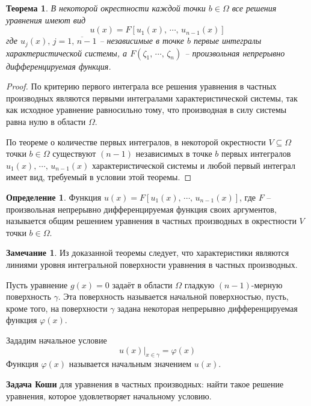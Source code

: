 \documentclass[a4paper,12pt]{article}
\renewcommand{\phi}{\ensuremath{\varphi}}
\theoremstyle{plain}
\newtheorem{theorem}{Теорема}[section]
\theoremstyle{definition}
\newtheorem{definition}{Определение}[section]
\newtheorem*{note}{Замечание}
\theoremstyle{remark}
\begin{document}
\begin{theorem}
	В некоторой окрестности каждой точки $b \in \Omega$ все решения уравнения имеют вид
	\[u(x) = F[u_1(x),\,\cdots,\,u_{n-1}(x)]\]
	где $u_j(x),\, j = \overline{1,\,n-1}$ -- независимые в точке $b$ первые интегралы характеристической системы, а $F(\zeta_1,\,\cdots,\,\zeta_n)$ -- произвольная непрерывно дифференцируемая функция.
\end{theorem}

\begin{proof}
	По критерию первого интеграла все решения уравнения в частных производных являются первыми интегралами характеристической системы, так как исходное уравнение равносильно тому, что производная в силу системы равна нулю в области $\Omega$.

	По теореме о количестве первых интегралов, в некоторой окрестности $V \subseteq \Omega$ точки $b \in \Omega$ существуют $(n-1)$ независимых в точке $b$ первых интегралов $u_1(x),\,\cdots,\,u_{n - 1}(x)$ характеристической системы и любой первый интеграл имеет вид, требуемый в условии этой теоремы.
\end{proof}

\begin{definition}
	Функция $u(x) = F[u_1(x),\,\cdots,\,u_{n-1}(x)]$, где $F$ -- произвольная непрерывно дифференцируемая функция своих аргументов, называется общим решением уравнения в частных производных в окрестности $V$ точки $b \in \Omega$.
\end{definition}

\begin{note}
	Из доказанной теоремы следует, что характеристики являются линиями уровня интегральной поверхности уравнения в частных производных.

	Пусть уравнение $g(x) = 0$ задаёт в области $\Omega$ гладкую $(n - 1)$-мерную поверхность $\gamma$. Эта поверхность называется начальной поверхностью, пусть, кроме того, на поверхности $\gamma$ задана некоторая непрерывно дифференцируемая функция $\phi(x)$.

	Зададим начальное условие
	\[u(x)|_{x \in \gamma} = \phi(x)\]
	Функция $\phi(x)$ называется начальным значением $u(x)$.

	\textbf{Задача Коши} для уравнения в частных производных: найти такое решение уравнения, которое удовлетворяет начальному условию.
\end{note}

\newpage
\end{document}
